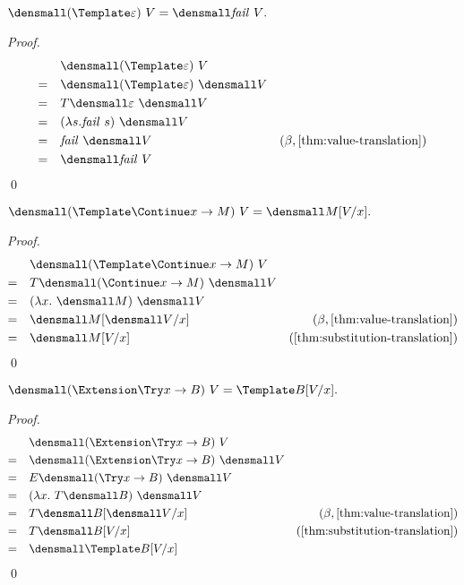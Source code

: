 \begin{lemma}
  \label{thm:templ-fail}
  $ \den{(\Template \varepsilon) ~ V} = \den{\mathit{fail}~V}.$
\end{lemma}
    \begin{proof}
        \begin{align*}
            &\quad \den{(\Template \varepsilon) ~ V} \\
            =& \quad \den{(\Template \varepsilon)} ~ \den{V}\\
            =& \quad T\den{\varepsilon} ~ \den{V} \\
            =& \quad (\lambda s. \mathit{fail} ~ s) ~ \den{V} \\
            =& \quad \mathit{fail} ~ \den{V} &(\beta, \cref{thm:value-translation}) \\
            =& \quad \den{\mathit{fail} ~ V}
        \end{align*}
        \qed
    \end{proof}

\begin{lemma}
  \label{thm:templ-continue}
  $ \den{(\Template \Continue x \to M) ~ V} = \den{M\subst{x}{V}}.$
\end{lemma}
\begin{proof}
  \begin{align*}
    &\quad \den{(\Template \Continue x \to M) ~ V} \\
    =& \quad T\den{(\Continue x \to M)} ~ \den{V}\\
    =& \quad (\lambda x. ~\den{M}) ~ \den{V} \\
    =& \quad \den{M}\subst{x}{\den{V}} & (\beta, \cref{thm:value-translation}) \\
    =& \quad \den{M\subst{x}{V}} &(\cref{thm:substitution-translation})
  \end{align*}
  \qed
\end{proof}

\begin{lemma}
  \label{thm:ext-try}
    $ \den{(\Extension \Try x \to B) ~ V} = \Template B\subst{x}{V}.$
\end{lemma}
\begin{proof}
  \begin{align*}
    &\quad \den{(\Extension \Try x \to B) ~ V}  \\
    =& \quad \den{(\Extension \Try x \to B)} ~ \den{V}\\
    =& \quad E\den{(\Try x \to B)} ~ \den{V}\\
    =& \quad (\lambda x. ~T\den{B}) ~ \den{V}\\
    =& \quad T\den{B}\subst{x}{\den{V}} &(\beta, \cref{thm:value-translation}) \\
    =& \quad T\den{B\subst{x}{V}} &(\cref{thm:substitution-translation}) \\
    =& \quad \den{\Template B\subst{x}{V}}
  \end{align*}
  \qed
\end{proof}

